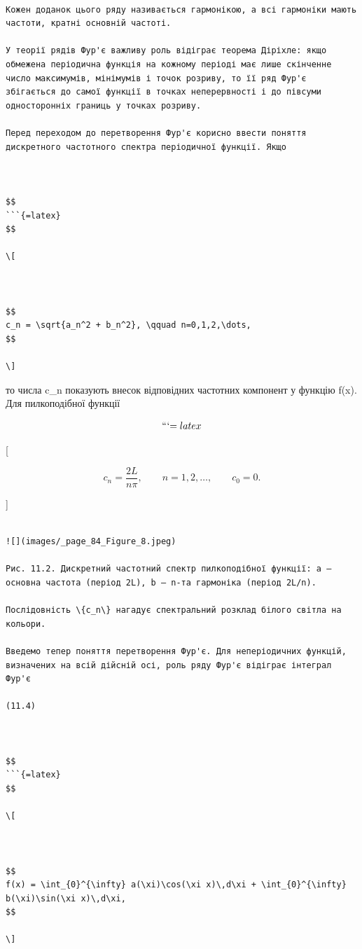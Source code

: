\documentclass[
  ukrainian,
]{article}
\begin{document}
\begin{verbatim}

Кожен доданок цього ряду називається гармонікою, а всі гармоніки мають частоти, кратні основній частоті.

У теорії рядів Фур'є важливу роль відіграє теорема Діріхле: якщо обмежена періодична функція на кожному періоді має лише скінченне число максимумів, мінімумів і точок розриву, то її ряд Фур'є збігається до самої функції в точках неперервності і до півсуми односторонніх границь у точках розриву.

Перед переходом до перетворення Фур'є корисно ввести поняття дискретного частотного спектра періодичної функції. Якщо



$$
```{=latex}
$$

\[



$$
c_n = \sqrt{a_n^2 + b_n^2}, \qquad n=0,1,2,\dots,
$$

\]
\end{verbatim}

то числа c\_n показують внесок відповідних частотних компонент у функцію
f(x). Для пилкоподібної функції

\[
```{=latex}
\]

{[}

\[
c_n = \frac{2L}{n\pi}, \qquad n=1,2,\dots, \qquad c_0 = 0.
\]

{]}

\begin{verbatim}

![](images/_page_84_Figure_8.jpeg)

Рис. 11.2. Дискретний частотний спектр пилкоподібної функції: a — основна частота (період 2L), b — n-та гармоніка (період 2L/n).

Послідовність \{c_n\} нагадує спектральний розклад білого світла на кольори.

Введемо тепер поняття перетворення Фур'є. Для неперіодичних функцій, визначених на всій дійсній осі, роль ряду Фур'є відіграє інтеграл Фур'є

(11.4)



$$
```{=latex}
$$

\[



$$
f(x) = \int_{0}^{\infty} a(\xi)\cos(\xi x)\,d\xi + \int_{0}^{\infty} b(\xi)\sin(\xi x)\,d\xi,
$$

\]
\end{verbatim}
\end{document}
